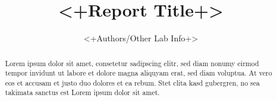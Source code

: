%
\usepackage{labreport}


	\title{<+Report Title+>}
	\author{<+Authors/Other Lab Info+>}
	\maketitle
	\begin{abstract}
	Lorem ipsum dolor sit amet, consetetur sadipscing elitr, sed diam nonumy eirmod
	tempor invidunt ut labore et dolore magna aliquyam erat, sed diam voluptua. At
	vero eos et accusam et justo duo dolores et ea rebum. Stet clita kasd gubergren,
	no sea takimata sanctus est Lorem ipsum dolor sit amet.
	\end{abstract}

	
	
	
	
	

